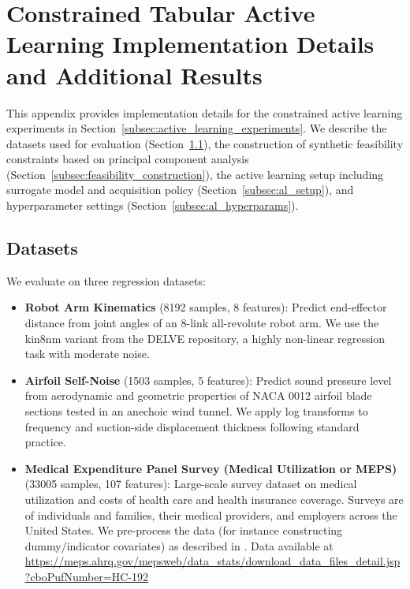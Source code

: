 \section{Constrained Tabular Active Learning Implementation Details and Additional Results}
\label{app:active_learning_details}

This appendix provides implementation details for the constrained active learning experiments in Section~\ref{subsec:active_learning_experiments}. We describe the datasets used for evaluation (Section~\ref{subsec:al_datasets}), the construction of synthetic feasibility constraints based on principal component analysis (Section~\ref{subsec:feasibility_construction}), the active learning setup including surrogate model and acquisition policy (Section~\ref{subsec:al_setup}), and hyperparameter settings (Section~\ref{subsec:al_hyperparams}).

\subsection{Datasets}
\label{subsec:al_datasets}

We evaluate on three regression datasets:

\begin{itemize}
    \item \textbf{Robot Arm Kinematics} \citep{delve1996kin} (8192 samples, 8 features): Predict end-effector distance from joint angles of an 8-link all-revolute robot arm. We use the kin8nm variant from the DELVE repository, a highly non-linear regression task with moderate noise.
    \item \textbf{Airfoil Self-Noise} \citep{brooks1989airfoil} (1503 samples, 5 features): Predict sound pressure level from aerodynamic and geometric properties of NACA 0012 airfoil blade sections tested in an anechoic wind tunnel. We apply log transforms to frequency and suction-side displacement thickness following standard practice.
    \item \textbf{Medical Expenditure Panel Survey (Medical Utilization or MEPS)} \citep{ezzati2008sample} (33005 samples, 107 features): Large-scale survey dataset on medical utilization and costs of health care and health insurance coverage. Surveys are of individuals and families, their medical providers, and employers across the United States. We pre-process the data (for instance constructing dummy/indicator covariates) as described in \citet{barber2021predictive}. Data available at \url{https://meps.ahrq.gov/mepsweb/data_stats/download_data_files_detail.jsp?cboPufNumber=HC-192}
\end{itemize}

